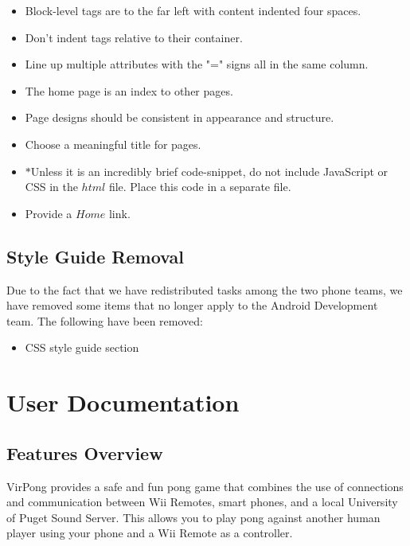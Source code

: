 \documentclass[12pt]{article}
\begin{document}
\begin{itemize}

\item Block-level tags are to the far left with content indented four spaces.

\item Don't indent tags relative to their container.

\item Line up multiple attributes with the "=" signs all in the same column.

\item The home page is an index to other pages.

\item Page designs should be consistent in appearance and structure.

\item Choose a meaningful title for pages.

\item $*$Unless it is an incredibly brief code-snippet, do not include JavaScript or CSS in the $html$ file.  Place this code in a separate file.

\item Provide a $Home$ link.

\end{itemize}



\subsection{Style Guide Removal}

Due to the fact that we have redistributed tasks among the two phone teams, we have removed some items that no longer apply to the Android Development team.  The following have been removed: 



\begin{itemize}

\item CSS style guide section

\end{itemize}

\section{User Documentation}
\subsection{Features Overview}
 VirPong provides a safe and fun pong game that combines the use of connections and communication between Wii Remotes, smart phones, and a local University of Puget Sound Server. This allows you to play pong against another human player using your phone and a Wii Remote as a controller.
\end{document}
